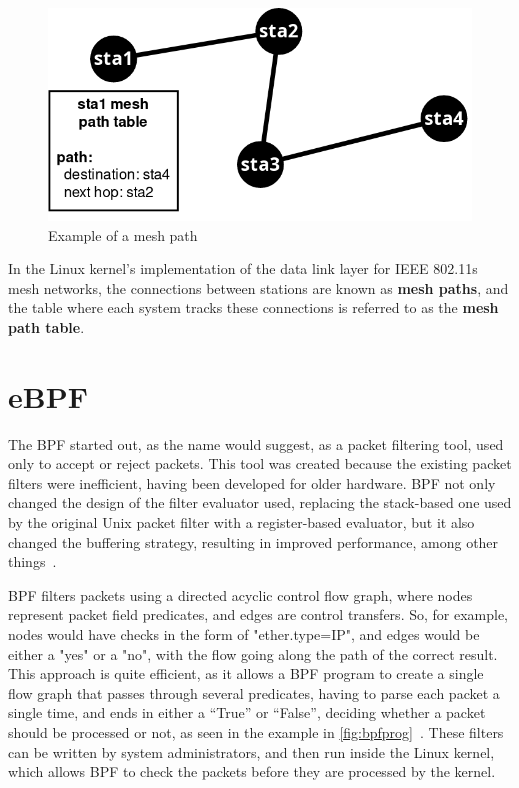 \begin{figure}[htb]
   \centering
   \includegraphics[scale=.4]{nexthop}
   \caption{Example of a mesh path}\label{fig:nexthop}
\end{figure}

In the Linux kernel's implementation of the data link layer for \ac{IEEE}
802.11s mesh networks, the connections between stations are known as
\textbf{mesh paths}, and the table where each system tracks these connections is
referred to as the \textbf{mesh path table}.


\section{eBPF}

The \ac{BPF} started out, as the name would suggest, as a packet filtering tool,
used only to accept or reject packets. This tool was created because the
existing packet filters were inefficient, having been developed for older
hardware. \ac{BPF} not only changed the design of the filter evaluator used,
replacing the stack-based one used by the original Unix packet filter with a
register-based evaluator, but it also changed the buffering strategy, resulting
in improved performance, among other things~\cite{bpf}.

\ac{BPF} filters packets using a directed acyclic control flow graph, where
nodes represent packet field predicates, and edges are control transfers. So,
for example, nodes would have checks in the form of "ether.type=IP", and edges
would be either a "yes" or a "no", with the flow going along the path of the
correct result. This approach is quite efficient, as it allows a \ac{BPF}
program to create a single flow graph that passes through several predicates,
having to parse each packet a single time, and ends in either a ``True'' or
``False'', deciding whether a packet should be processed or not, as seen in the
example in \autoref{fig:bpfprog}~\cite{bpf}. These filters can be written by
system administrators, and then run inside the Linux kernel, which allows
\ac{BPF} to check the packets before they are processed by the kernel.

